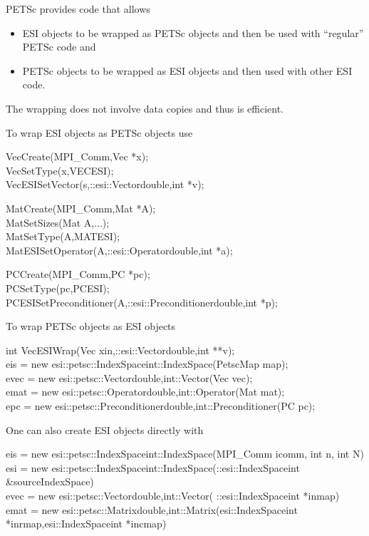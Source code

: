 PETSc provides code that allows
\begin{itemize}
\item  ESI objects to be wrapped as PETSc objects
      and then be used with ``regular'' PETSc code and
\item PETSc objects to be wrapped as ESI objects and then used with other
      ESI code.
\end{itemize}
The wrapping does not involve data copies and thus is efficient.

To wrap ESI objects as PETSc objects use
\begin{tabbing}
VecCreate(MPI\_Comm,Vec *x);\\
VecSetType(x,VECESI);\\
VecESISetVector(s,::esi::Vector\trl{<}double,int\trl{>} *v);
\end{tabbing}

\begin{tabbing}
MatCreate(MPI\_Comm,Mat *A);\\
MatSetSizes(Mat A,...);\\
MatSetType(A,MATESI);\\
MatESISetOperator(A,::esi::Operator\trl{<}double,int\trl{>} *a);
\end{tabbing}

\begin{tabbing}
PCCreate(MPI\_Comm,PC *pc);\\
PCSetType(pc,PCESI);\\
PCESISetPreconditioner(A,::esi::Preconditioner\trl{<}double,int\trl{>} *p);
\end{tabbing}

To wrap PETSc objects as ESI objects
\begin{tabbing}
int VecESIWrap(Vec xin,::esi::Vector\trl{<}double,int\trl{>} **v);\\
eis  = new esi::petsc::IndexSpace\trl{<}int\trl{>}::IndexSpace(PetscMap map);\\
evec = new esi::petsc::Vector\trl{<}double,int\trl{>}::Vector(Vec vec);\\
emat = new esi::petsc::Operator\trl{<}double,int\trl{>}::Operator(Mat mat);\\
epc  = new esi::petsc::Preconditioner\trl{<}double,int\trl{>}::Preconditioner(PC pc);
\end{tabbing}

One can also create ESI objects directly with 
\begin{tabbing}
eis  = new esi::petsc::IndexSpace\trl{<}int\trl{>}::IndexSpace(MPI\_Comm icomm, int n, int N)\\
esi  = new esi::petsc::IndexSpace\trl{<}int\trl{>}::IndexSpace(::esi::IndexSpace\trl{<}int\trl{>} \&sourceIndexSpace)\\
evec = new esi::petsc::Vector\trl{<}double,int\trl{>}::Vector( ::esi::IndexSpace\trl{<}int\trl{>} *inmap)\\
emat = new esi::petsc::Matrix\trl{<}double,int\trl{>}::Matrix(esi::IndexSpace\trl{<}int\trl{>} *inrmap,esi::IndexSpace\trl{<}int\trl{>} *incmap)
\end{tabbing}

